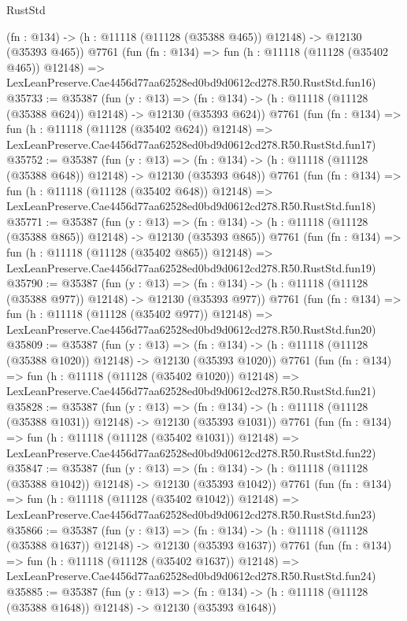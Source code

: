 \begin{lexlean}{RustStd}
\begin{coremodule}
    (fn : @134) -> (h : @11118 (@11128 (@35388 @465)) @12148) -> @12130 (@35393 @465))
    @7761
    (fun (fn : @134) =>
    fun (h : @11118 (@11128 (@35402 @465)) @12148) =>
    LexLeanPreserve.Cae4456d77aa62528ed0bd9d0612cd278.R50.RustStd.fun16)
@35733 := @35387
    (fun (y : @13) =>
    (fn : @134) -> (h : @11118 (@11128 (@35388 @624)) @12148) -> @12130 (@35393 @624))
    @7761
    (fun (fn : @134) =>
    fun (h : @11118 (@11128 (@35402 @624)) @12148) =>
    LexLeanPreserve.Cae4456d77aa62528ed0bd9d0612cd278.R50.RustStd.fun17)
@35752 := @35387
    (fun (y : @13) =>
    (fn : @134) -> (h : @11118 (@11128 (@35388 @648)) @12148) -> @12130 (@35393 @648))
    @7761
    (fun (fn : @134) =>
    fun (h : @11118 (@11128 (@35402 @648)) @12148) =>
    LexLeanPreserve.Cae4456d77aa62528ed0bd9d0612cd278.R50.RustStd.fun18)
@35771 := @35387
    (fun (y : @13) =>
    (fn : @134) -> (h : @11118 (@11128 (@35388 @865)) @12148) -> @12130 (@35393 @865))
    @7761
    (fun (fn : @134) =>
    fun (h : @11118 (@11128 (@35402 @865)) @12148) =>
    LexLeanPreserve.Cae4456d77aa62528ed0bd9d0612cd278.R50.RustStd.fun19)
@35790 := @35387
    (fun (y : @13) =>
    (fn : @134) -> (h : @11118 (@11128 (@35388 @977)) @12148) -> @12130 (@35393 @977))
    @7761
    (fun (fn : @134) =>
    fun (h : @11118 (@11128 (@35402 @977)) @12148) =>
    LexLeanPreserve.Cae4456d77aa62528ed0bd9d0612cd278.R50.RustStd.fun20)
@35809 := @35387
    (fun (y : @13) =>
    (fn : @134) -> (h : @11118 (@11128 (@35388 @1020)) @12148) -> @12130 (@35393 @1020))
    @7761
    (fun (fn : @134) =>
    fun (h : @11118 (@11128 (@35402 @1020)) @12148) =>
    LexLeanPreserve.Cae4456d77aa62528ed0bd9d0612cd278.R50.RustStd.fun21)
@35828 := @35387
    (fun (y : @13) =>
    (fn : @134) -> (h : @11118 (@11128 (@35388 @1031)) @12148) -> @12130 (@35393 @1031))
    @7761
    (fun (fn : @134) =>
    fun (h : @11118 (@11128 (@35402 @1031)) @12148) =>
    LexLeanPreserve.Cae4456d77aa62528ed0bd9d0612cd278.R50.RustStd.fun22)
@35847 := @35387
    (fun (y : @13) =>
    (fn : @134) -> (h : @11118 (@11128 (@35388 @1042)) @12148) -> @12130 (@35393 @1042))
    @7761
    (fun (fn : @134) =>
    fun (h : @11118 (@11128 (@35402 @1042)) @12148) =>
    LexLeanPreserve.Cae4456d77aa62528ed0bd9d0612cd278.R50.RustStd.fun23)
@35866 := @35387
    (fun (y : @13) =>
    (fn : @134) -> (h : @11118 (@11128 (@35388 @1637)) @12148) -> @12130 (@35393 @1637))
    @7761
    (fun (fn : @134) =>
    fun (h : @11118 (@11128 (@35402 @1637)) @12148) =>
    LexLeanPreserve.Cae4456d77aa62528ed0bd9d0612cd278.R50.RustStd.fun24)
@35885 := @35387
    (fun (y : @13) =>
    (fn : @134) -> (h : @11118 (@11128 (@35388 @1648)) @12148) -> @12130 (@35393 @1648))

\end{coremodule}
\end{lexlean}
